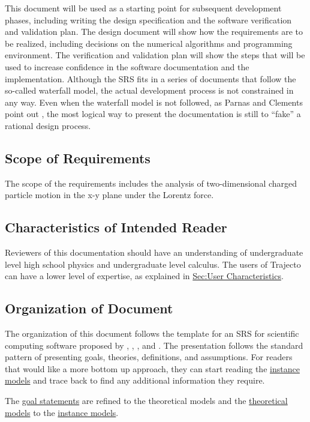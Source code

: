 \documentclass[12pt]{article}
\begin{document}
This document will be used as a starting point for subsequent development phases, including writing the design specification and the software verification and validation plan. The design document will show how the requirements are to be realized, including decisions on the numerical algorithms and programming environment. The verification and validation plan will show the steps that will be used to increase confidence in the software documentation and the implementation. Although the SRS fits in a series of documents that follow the so-called waterfall model, the actual development process is not constrained in any way. Even when the waterfall model is not followed, as Parnas and Clements point out \cite{parnasClements1986}, the most logical way to present the documentation is still to ``fake'' a rational design process.

\subsection{Scope of Requirements}
\label{Sec:ReqsScope}
The scope of the requirements includes the analysis of two-dimensional charged particle motion in the x-y plane under the Lorentz force.

\subsection{Characteristics of Intended Reader}
\label{Sec:ReaderChars}
Reviewers of this documentation should have an understanding of undergraduate level high school physics and undergraduate level calculus. The users of Trajecto can have a lower level of expertise, as explained in \hyperref[Sec:UserChars]{Sec:User Characteristics}.

\subsection{Organization of Document}
\label{Sec:DocOrg}
The organization of this document follows the template for an SRS for scientific computing software proposed by \cite{koothoor2013}, \cite{smithLai2005}, \cite{smithEtAl2007}, and \cite{smithKoothoor2016}. The presentation follows the standard pattern of presenting goals, theories, definitions, and assumptions. For readers that would like a more bottom up approach, they can start reading the \hyperref[Sec:IMs]{instance models} and trace back to find any additional information they require.

The \hyperref[Sec:GoalStmt]{goal statements} are refined to the theoretical models and the \hyperref[Sec:TMs]{theoretical models} to the \hyperref[Sec:IMs]{instance models}.
\end{document}
